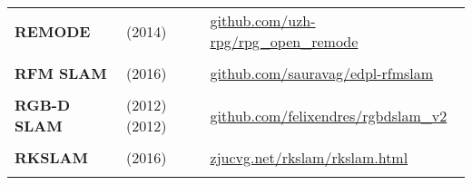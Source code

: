 \documentclass[a4paper,12pt]{scrartcl}
\begin{document}
{\begin{longtable}{l|l|l}
    \textbf{REMODE}                                                                                                               & \cite{Pizzoli2014} (2014)
                                                                                                                                  & {\href{https://github.com/uzh-rpg/rpg_open_remode}{github.com/uzh-rpg/rpg\_open\_remode}} \\
                                                                                                                                  &                                                                                            &   \\ [-3mm]
    \textbf{RFM SLAM}                                                                                                             & \cite{Agarwal2016} (2016)
                                                                                                                                  & {\href{https://github.com/sauravag/edpl-rfmslam}{github.com/sauravag/edpl-rfmslam}}       \\
                                                                                                                                  &                                                                                            &   \\ [-3mm]
    \textbf{RGB-D SLAM}                                                                                                           & \cite{Endres2012} (2012) \cite{Endres2012a} (2012)
                                                                                                                                  & {\href{https://github.com/felixendres/rgbdslam_v2}{github.com/felixendres/rgbdslam\_v2}}  \\
                                                                                                                                  &                                                                                            &   \\ [-3mm]
    \textbf{RKSLAM}                                                                                                               & \cite{Liu2016} (2016)
                                                                                                                                  & {\href{https://zjucvg.net/rkslam/rkslam.html}{zjucvg.net/rkslam/rkslam.html}}             \\
                                                                                                                                  &                                                                                            &   \\ [-3mm]

\end{longtable}}
\end{document}
